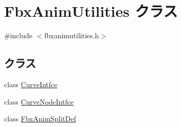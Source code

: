 \hypertarget{class_fbx_anim_utilities}{}\section{Fbx\+Anim\+Utilities クラス}
\label{class_fbx_anim_utilities}


{\ttfamily \#include $<$fbxanimutilities.\+h$>$}

\subsection*{クラス}
\begin{DoxyCompactItemize}
\item 
class \hyperlink{class_fbx_anim_utilities_1_1_curve_intfce}{Curve\+Intfce}
\item 
class \hyperlink{class_fbx_anim_utilities_1_1_curve_node_intfce}{Curve\+Node\+Intfce}
\item 
class \hyperlink{class_fbx_anim_utilities_1_1_fbx_anim_split_def}{Fbx\+Anim\+Split\+Def}
\end{DoxyCompactItemize}
